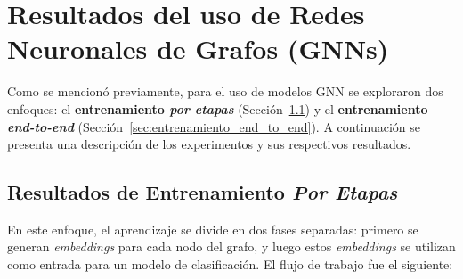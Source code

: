 \section{Resultados del uso de Redes Neuronales de Grafos (GNNs)} \label{sec:gnn_result_section}

Como se mencionó previamente, para el uso de modelos GNN se exploraron dos enfoques: el \textbf{entrenamiento \textit{por etapas}} (Sección~\ref{sec:resultados_entrenamiento_por_etapas}) y el \textbf{entrenamiento \textit{end-to-end}} (Sección~\ref{sec:entrenamiento_end_to_end}).
A continuación se presenta una descripción de los experimentos y sus respectivos resultados.\\







\subsection{Resultados de Entrenamiento \textit{Por Etapas}} \label{sec:resultados_entrenamiento_por_etapas}

En este enfoque, el aprendizaje se divide en dos fases separadas: primero se generan \textit{embeddings} para cada nodo del grafo, y luego estos \textit{embeddings} se utilizan como entrada para un modelo de clasificación. El flujo de trabajo fue el siguiente:


